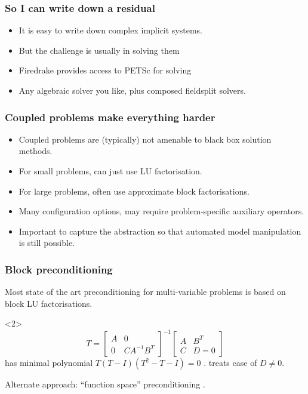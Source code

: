 \documentclass[presentation]{beamer}
\begin{document}
\begin{frame}
  \frametitle{So I can write down a residual}
  \begin{itemize}
  \item It is easy to write down complex implicit systems.
  \item But the challenge is usually in solving them
  \item Firedrake provides access to PETSc for solving
  \item Any algebraic solver you like, plus composed fieldsplit solvers.
  \end{itemize}
\end{frame}

\begin{frame}
  \frametitle{Coupled problems make everything harder}
  \begin{itemize}
  \item Coupled problems are (typically) not amenable to black box solution
    methods.
  \item For small problems, can just use LU factorisation.
  \item For large problems, often use approximate block factorisations.
  \item Many configuration options, may require problem-specific
    auxiliary operators.
  \item Important to capture the abstraction so that automated model
    manipulation is still possible.
  \end{itemize}
\end{frame}

\begin{frame}
  \frametitle{Block preconditioning}
  Most state of the art preconditioning for multi-variable
  problems is based on block LU factorisations.

  \begin{uncoverenv}<2>
    \begin{equation*}
      T = \begin{bmatrix}
        A & 0 \\
        0 & C A^{-1} B^T
      \end{bmatrix}^{-1}
      \begin{bmatrix}
        A & B^T \\
        C & D = 0
      \end{bmatrix}
    \end{equation*}
    has minimal polynomial $T(T - I)(T^2 - T - I) =
    0$ \parencite{Murphy:2000}. \textcite{Ipsen:2001} treats case of
    $D \ne 0$.

    Alternate approach: ``function space''
    preconditioning \parencite{Kirby:2010,Mardal:2011,Malek:2014}.
  \end{uncoverenv}
\end{frame}
\end{document}
